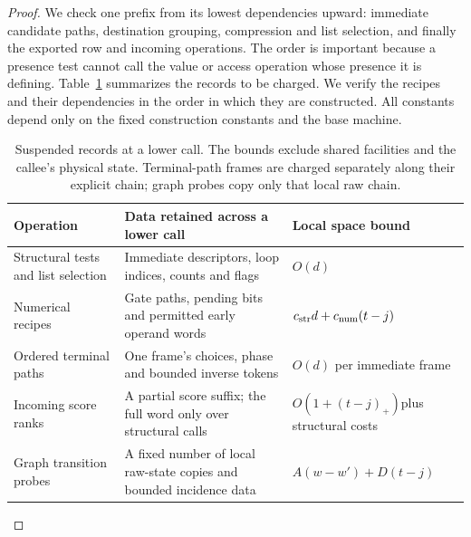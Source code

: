 \begin{proof}
We check one prefix from its lowest dependencies upward: immediate candidate paths, destination grouping, compression and list selection, and finally the exported row and incoming operations. The order is important because a presence test cannot call the value or access operation whose presence it is defining. Table~\ref{tab:ctrl-records} summarizes the records to be charged.
We verify the recipes and their dependencies in the order in which they
are constructed.  All constants depend only on the fixed construction
constants and the base machine.

\begin{table}[tbp]
\centering
\small
\renewcommand{\arraystretch}{1.15}
\begin{tabular}{@{}p{}p{}p{}@{}}
\toprule
Operation & Data retained across a lower call & Local space bound \\
\midrule
Structural tests and list selection
 & Immediate descriptors, loop indices, counts and flags
 & $O(d)$ \\
Numerical recipes
 & Gate paths, pending bits and permitted early operand words
 & $c_{\rm str}d+c_{\rm num}(t-j)$ \\
Ordered terminal paths
 & One frame's choices, phase and bounded inverse tokens
 & $O(d)$ per immediate frame \\
Incoming score ranks
 & A partial score suffix; the full word only over structural calls
 & $O(1+(t-j)_+)$\newline plus structural costs \\
Graph transition probes
 & A fixed number of local raw-state copies and bounded incidence data
 & $A(w-w')+D(t-j)$ \\
\bottomrule
\end{tabular}
\caption{Suspended records at a lower call.  The bounds exclude shared
facilities and the callee's physical state.  Terminal-path frames are
charged separately along their explicit chain; graph probes copy only
that local raw chain.}
\label{tab:ctrl-records}
\end{table}


\end{proof}
